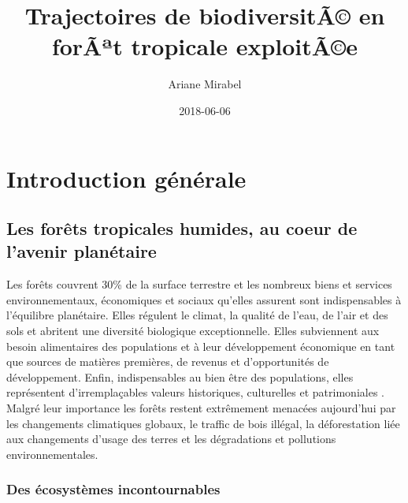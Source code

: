 \documentclass[
  11pt,
  french,
  A4paper,
  extrafontsizes,onecolumn,openright
  ]{memoir}
\title{Trajectoires de biodiversitÃ© en forÃªt tropicale exploitÃ©e}
\author{Ariane Mirabel}
\date{2018-06-06}
\begin{document}
\frontmatter



\makeflyleaf









\LargeMargins
{
\hypersetup{linkcolor=}
\setcounter{tocdepth}{3}
\tableofcontents
}



\LargeMargins
\mainmatter

\chapter{Introduction générale}\label{introduction-generale}

\section{Les forêts tropicales humides, au coeur de l'avenir
planétaire}\label{les-forets-tropicales-humides-au-coeur-de-lavenir-planetaire}

Les forêts couvrent 30\% de la surface terrestre et les nombreux biens
et services environnementaux, économiques et sociaux qu'elles assurent
sont indispensables à l'équilibre planétaire. Elles régulent le climat,
la qualité de l'eau, de l'air et des sols et abritent une diversité
biologique exceptionnelle. Elles subviennent aux besoin alimentaires des
populations et à leur développement économique en tant que sources de
matières premières, de revenus et d'opportunités de développement.
Enfin, indispensables au bien être des populations, elles représentent
d'irremplaçables valeurs historiques, culturelles et patrimoniales
\autocites{FRA2015}{Tilman2014}. Malgré leur importance les forêts
restent extrêmement menacées aujourd'hui par les changements climatiques
globaux, le traffic de bois illégal, la déforestation liée aux
changements d'usage des terres et les dégradations et pollutions
environnementales.

\subsection{Des écosystèmes
incontournables}\label{des-ecosystemes-incontournables}
\end{document}
